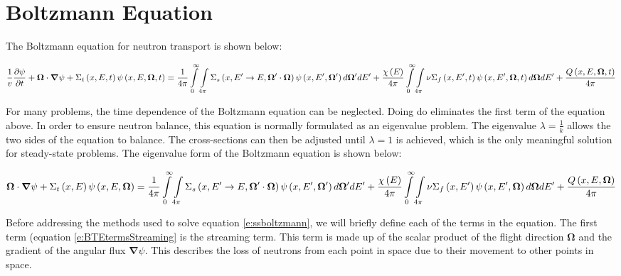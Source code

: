 \section{Boltzmann Equation}

The Boltzmann equation for neutron transport is shown below:

\begin{dmath}\label{e:boltzmann}
{\frac{1}{v} \frac{\partial \psi}{\partial t} + \bm \Omega \cdot \bm \nabla \psi + \Sigma_t\left(x,E,t\right)\psi\left(x,E,\bm \Omega,t\right)} = {\frac{1}{4\pi}\intop_0^{\infty} \intop_{4\pi} \Sigma_s\left(x,E' \rightarrow E, \bm \Omega' \cdot \bm \Omega\right) \psi\left(x,E',\bm \Omega'\right) d\bm \Omega' dE'} + {\frac{\chi\left(E\right)}{4\pi} \intop_0^{\infty} \intop_{4\pi} \nu \Sigma_f\left(x,E',t\right) \psi\left(x,E',\bm \Omega,t\right) d\bm\Omega dE' + \frac{Q\left(x,E,\bm \Omega,t\right)}{4\pi}}
\end{dmath}

For many problems, the time dependence of the Boltzmann equation can be neglected.  Doing do eliminates the first term of the equation above.  In order to ensure neutron balance, this equation is normally formulated as an eigenvalue problem.  The eigenvalue $\lambda = \frac{1}{k}$ allows the two sides of the equation to balance.  The cross-sections can then be adjusted until $\lambda = 1$ is achieved, which is the only meaningful solution for steady-state problems.  The eigenvalue form of the Boltzmann equation is shown below:

\begin{dmath}\label{e:ssboltzmann}
{\bm \Omega \cdot \bm \nabla \psi + \Sigma_t\left(x,E\right)\psi\left(x,E,\bm \Omega\right) = \frac{1}{4\pi}\intop_0^{\infty} \intop_{4\pi} \Sigma_s\left(x,E' \rightarrow E, \bm \Omega' \cdot \bm \Omega\right) \psi\left(x,E',\bm \Omega'\right) d\bm \Omega' dE'} + {\frac{\chi\left(E\right)}{4\pi} \intop_0^{\infty} \intop_{4\pi} \nu \Sigma_f\left(x,E'\right) \psi\left(x,E',\bm \Omega\right) d\bm\Omega dE' + \frac{Q\left(x,E,\bm \Omega\right)}{4\pi}}
\end{dmath}

Before addressing the methods used to solve equation \ref{e:ssboltzmann}, we will briefly define each of the terms in the equation.  The first term (equation \ref{e:BTEtermsStreaming} is the streaming term.  This term is made up of the scalar product of the flight direction $\bm \Omega$ and the gradient of the angular flux $\bm \nabla \psi$.  This describes the loss of neutrons from each point in space due to their movement to other points in space.

